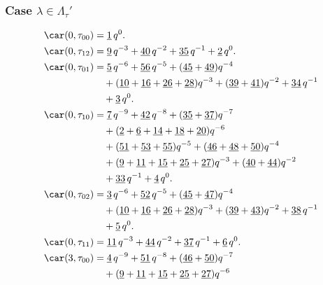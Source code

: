 
\subsubsection{Case $\lambda\in \Lambda_\tau'$}

\begin{align*}
	\car(0,\tau_{00})
	&=\underline{1}\,q^0.\\
	\car(0,\tau_{12})
	&=\underline{9}\,q^{-3}+\underline{40}\,q^{-2}+\underline{35}\,q^{-1}+\underline{2}\,q^0.\\
	\car(0,\tau_{01})
	&=\underline{5}\,q^{-6}+\underline{56}\,q^{-5}+(\underline{45}+\underline{49})q^{-4}\\
	&\quad+(\underline{10}+\underline{16}+\underline{26}+\underline{28})q^{-3}+(\underline{39}+\underline{41})q^{-2}+\underline{34}\,q^{-1}\\
	&\quad+\underline{3}\,q^0.\\
	\car(0,\tau_{10})
	&=\underline{7}\,q^{-9}+\underline{42}\,q^{-8}+(\underline{35}+\underline{37})q^{-7}\\
	&\quad+(\underline{2}+\underline{6}+\underline{14}+\underline{18}+\underline{20})q^{-6}\\
	&\quad+(\underline{51}+\underline{53}+\underline{55})q^{-5}+(\underline{46}+\underline{48}+\underline{50})q^{-4}\\
	&\quad+(\underline{9}+\underline{11}+\underline{15}+\underline{25}+\underline{27})q^{-3}+(\underline{40}+\underline{44})q^{-2}\\
	&\quad+\underline{33}\,q^{-1}+\underline{4}\,q^0.\\
	\car(0,\tau_{02})
	&=\underline{3}\,q^{-6}+\underline{52}\,q^{-5}+(\underline{45}+\underline{47})q^{-4}\\
	&\quad+(\underline{10}+\underline{16}+\underline{26}+\underline{28})q^{-3}+(\underline{39}+\underline{43})q^{-2}+\underline{38}\,q^{-1}\\
	&\quad+\underline{5}\,q^0.\\
	\car(0,\tau_{11})
	&=\underline{11}\,q^{-3}+\underline{44}\,q^{-2}+\underline{37}\,q^{-1}+\underline{6}\,q^0.\\
	\car(3,\tau_{00})
	&=\underline{4}\,q^{-9}+\underline{51}\,q^{-8}+(\underline{46}+\underline{50})q^{-7}\\
	&\quad+(\underline{9}+\underline{11}+\underline{15}+\underline{25}+\underline{27})q^{-6}\\

\end{align*}

